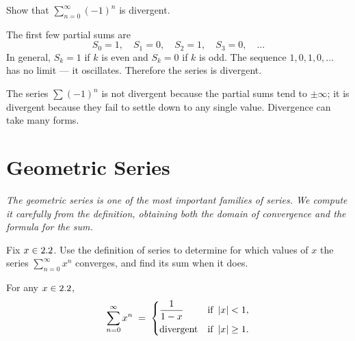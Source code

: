 \begin{example}
\label{ex:13-6}
Show that $\displaystyle\sum_{n=0}^{\infty}(-1)^{n}$ is divergent.

The first few partial sums are
\[
  S_{0}=1,\quad S_{1}=0,\quad S_{2}=1,\quad S_{3}=0,\quad\ldots
\]
In general, $S_{k}=1$ if $k$ is even and $S_{k}=0$ if $k$ is odd.  The sequence $1,0,1,0,\ldots$ has no limit --- it oscillates.  Therefore the series is divergent.
\end{example}

\begin{remark}
The series $\sum(-1)^{n}$ is not divergent because the partial sums tend to $\pm\infty$; it is divergent because they fail to settle down to any single value.  Divergence can take many forms.
\end{remark}

\section{Geometric Series}
\label{sec:13.5}

\textit{The geometric series is one of the most important families of series.  We compute it carefully from the definition, obtaining both the domain of convergence and the formula for the sum.}

\begin{remark}
Fix $x\in2.2$.  Use the definition of series to determine for which values of $x$ the series $\sum_{n=0}^{\infty}x^{n}$ converges, and find its sum when it does.
\end{remark}

\begin{theorem}
\label{thm:13-1}
For any $x\in2.2$,
\[
  \sum_{n=0}^{\infty}x^{n} \;=\;
  \begin{cases}
    \dfrac{1}{1-x} & \text{if } \left\lvert x \right\rvert<1, \\[6pt]
    \text{divergent} & \text{if } \left\lvert x \right\rvert\ge 1.
  \end{cases}
\]
\end{theorem}

